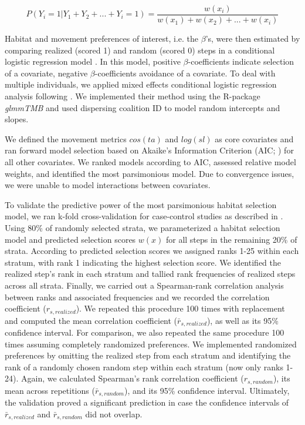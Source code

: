 \documentclass[abstract=off,10pt,a4paper,bibliography=totocnumbered]{article}
\begin{document}
\begin{equation}
\label{EQ3}
  P(Y_{i} = 1 | Y_{1} + Y_{2} + ... + Y_{i} = 1) =
  \frac{w(x_{i})}{w(x_{1}) + w(x_{2}) + ... + w(x_{i})}
\end{equation}

\noindent Habitat and movement preferences of interest, i.e. the \(\beta\)'s,
were then estimated by comparing realized (scored 1) and random (scored 0) steps
in a conditional logistic regression model \citep{Fortin.2005}. In this model,
positive \(\beta\)-coefficients indicate selection of a covariate, negative
\(\beta\)-coefficients avoidance of a covariate. To deal with multiple
individuals, we applied mixed effects conditional logistic regression analysis
following \cite{Muff.2020}. We implemented their method using the R-package
\textit{glmmTMB} \citep{Mollie.2017} and used dispersing coalition ID to model
random intercepts and slopes.

We defined the movement metrics \(cos(ta)\) and \(log(sl)\) as core covariates
and ran forward model selection based on Akaike's Information Criterion (AIC;
\citealp{Burnham.2002}) for all other covariates. We ranked models according to
AIC, assessed relative model weights, and identified the most parsimonious
model. Due to convergence issues, we were unable to model interactions between
covariates.

To validate the predictive power of the most parsimonious habitat selection
model, we ran k-fold cross-validation for case-control studies as described in
\cite{Fortin.2009}. Using 80\% of randomly selected strata, we parameterized a
habitat selection model and predicted selection scores \(w(x)\) for all steps in
the remaining 20\% of strata. According to predicted selection scores we
assigned ranks 1-25 within each stratum, with rank 1 indicating the highest
selection score. We identified the realized step's rank in each stratum and
tallied rank frequencies of realized steps across all strata. Finally, we
carried out a Spearman-rank correlation analysis between ranks and associated
frequencies and we recorded the correlation coefficient (\(r_{s, realized}\)).
We repeated this procedure 100 times with replacement and computed the mean
correlation coefficient (\(\bar{r}_{s, realized}\)), as well as its 95\%
confidence interval. For comparison, we also repeated the same procedure 100
times assuming completely randomized preferences. We implemented randomized
preferences by omitting the realized step from each stratum and identifying the
rank of a randomly chosen random step within each stratum (now only ranks 1-24).
Again, we calculated Spearman's rank correlation coefficient (\(r_{s,
random}\)), its mean across repetitions (\(\bar{r}_{s, random}\)), and its 95\%
confidence interval. Ultimately, the validation proved a significant prediction
in case the confidence intervals of \(\bar{r}_{s, realized}\) and \(\bar{r}_{s,
random}\) did not overlap.
\end{document}
